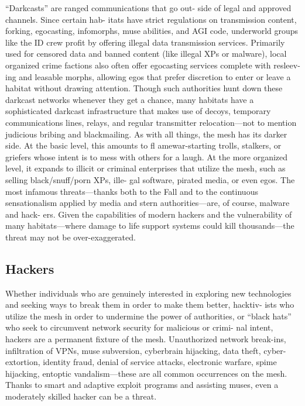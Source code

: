 ``Darkcasts'' are ranged communications that go out-
side of legal and approved channels. Since certain hab-
itats have strict regulations on transmission content, 
forking, egocasting, infomorphs, muse abilities, and 
AGI code, underworld groups like the ID crew profit 
by offering illegal data transmission services. Primarily 
used for censored data and banned content (like illegal 
XPs or malware), local organized crime factions also 
often offer egocasting services complete with resleev-
ing and leasable morphs, allowing egos that prefer 
discretion to enter or leave a habitat without drawing 
attention. Though such authorities hunt down these 
darkcast networks whenever they get a chance, many 
habitats have a sophisticated darkcast infrastructure 
that makes use of decoys, temporary communications 
lines, relays, and regular transmitter relocation—not 
to mention judicious bribing and blackmailing.
As with all things, the mesh has its darker side. At 
the basic level, this amounts to fl amewar-starting 
trolls, stalkers, or griefers whose intent is to mess 
with others for a laugh. At the more organized level, 
it expands to illicit or criminal enterprises that utilize 
the mesh, such as selling black/snuff/porn XPs, ille-
gal software, pirated media, or even egos. The most 
infamous threats—thanks both to the Fall and to 
the continuous sensationalism applied by media and 
stern authorities—are, of course, malware and hack-
ers. Given the capabilities of modern hackers and the 
vulnerability of many habitats—where damage to life 
support systems could kill thousands—the threat may 
not be over-exaggerated.

\subsection{Hackers}

Whether individuals who are genuinely interested 
in exploring new technologies and seeking ways to 
break them in order to make them better, hacktiv-
ists who utilize the mesh in order to undermine the 
power of authorities, or ``black hats'' who seek to 
circumvent network security for malicious or crimi-
nal intent, hackers are a permanent fixture of the 
mesh. Unauthorized network break-ins, infiltration 
of VPNs, muse subversion, cyberbrain hijacking, data 
theft, cyber-extortion, identity fraud, denial of service 
attacks, electronic warfare, spime hijacking, entoptic 
vandalism—these are all common occurrences on the 
mesh. Thanks to smart and adaptive exploit programs 
and assisting muses, even a moderately skilled hacker 
can be a threat.


